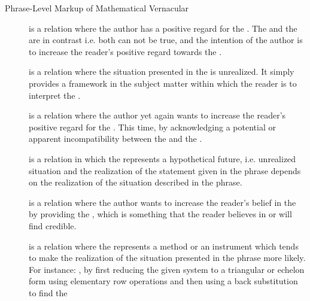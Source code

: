 \begin{module}[id=mtext]
\begin{omgroup}[id=mtext,short=Mathematical Text]
\begin{omgroup}[id=phrases]{Phrase-Level Markup of Mathematical Vernacular}
\begin{description}
\item[{}] is a relation where the author has a
  positive regard for the . The
   and the  are in
  contrast i.e. both can not be true, and the intention of the author is to increase the
  reader's positive regard towards the .
\item[{}] is a relation where the situation
  presented in the  is unrealized. It simply provides a
  framework in the subject matter within which the reader is to interpret the
  .
\item[{}] is a relation where the author yet again
  wants to increase the reader's positive regard for the
  . This time, by acknowledging a potential or apparent
  incompatibility between the  and the
  .
\item[{}] is a relation in which the
   represents a hypothetical future, i.e. unrealized
  situation and the realization of the statement given in the
   phrase depends on the realization of the situation
  described in the  phrase.
\item[{}] is a relation where the author wants to
  increase the reader's belief in the  by providing the
  , which is something that the reader believes in or
  will find credible.
\item[{}] is a relation where the
   represents a method or an instrument which tends to
  make the realization of the situation presented in the 
  phrase more likely.  For instance: {}, by first reducing the given system to a triangular or echelon
  form using elementary row operations and then using a back substitution to find the

\end{description}
\end{omgroup}
\end{omgroup}
\end{module}
